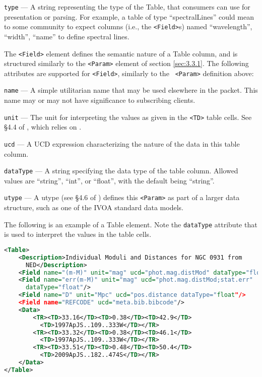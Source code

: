 \documentclass[11pt,a4paper]{ivoa}
\begin{document}
 \texttt{type}\label{sec:3.3.3.2} --- A string representing 
the type of the Table, that consumers can use for presentation or parsing. For 
example, a table of type ``spectralLines'' could mean to some community to 
expect columns (i.e., the \texttt{<Field>}s) named ``wavelength'', ``width'', 
``name'' to define spectral lines. 

The \texttt{<Field>} element defines the semantic nature of a Table column, and is 
structured similarly to the \texttt{<Param>} element of section \ref{sec:3.3.1}. 
The following attributes are supported for \texttt{<Field>}, similarly to the \texttt{
<Param>} definition above: 

 \texttt{name}\label{sec:3.3.3.3} --- A simple utilitarian 
name that may be used elsewhere in the packet. This name may or may not have 
significance to subscribing clients. 

 \texttt{unit}\label{sec:3.3.3.4} --- The unit for 
interpreting the values as given in the \texttt{<TD>} table cells. See \S4.4 of 
\citep{2019ivoa.spec.1021O}, which relies on \citep{2014ivoa.spec.0523D}. 

 \texttt{ucd}\label{sec:3.3.3.5} --- A UCD 
\citep{2018ivoa.spec.0527P} expression characterizing the nature of the data in 
this table column. 

 \texttt{dataType}\label{sec:3.3.3.6} --- A string specifying 
the data type of the table column. Allowed values are ``string'', ``int'', or 
``float'', with the default being ``string''.
 
 \texttt{utype}\label{sec:3.3.3.7} --- A utype (see \S4.6 of 
\citep{2019ivoa.spec.1021O}) defines this \texttt{<Param>} as part of a larger data 
structure, such as one of the IVOA standard data models. 
 
 The following is an example of a Table element. Note the \texttt{dataType} 
 attribute that is used to interpret the values in the table cells. 
\begin{lstlisting}[language=XML]
<Table>
    <Description>Individual Moduli and Distances for NGC 0931 from
      NED</Description>
    <Field name="(m-M)" unit="mag" ucd="phot.mag.distMod" dataType="float"/>
    <Field name="err(m-M)" unit="mag" ucd="phot.mag.distMod;stat.err"
      dataType="float"/>
    <Field name="D" unit="Mpc" ucd="pos.distance dataType="float"/>
    <Field name="REFCODE" ucd="meta.bib.bibcode"/>
    <Data>
        <TR><TD>33.16</TD><TD>0.38</TD><TD>42.9</TD>
          <TD>1997ApJS..109..333W</TD></TR>
        <TR><TD>33.32</TD><TD>0.38</TD><TD>46.1</TD>
          <TD>1997ApJS..109..333W</TD></TR>
        <TR><TD>33.51</TD><TD>0.48</TD><TD>50.4</TD>
          <TD>2009ApJS..182..474S</TD></TR>
    </Data>
</Table>
\end{lstlisting}
\end{document}
